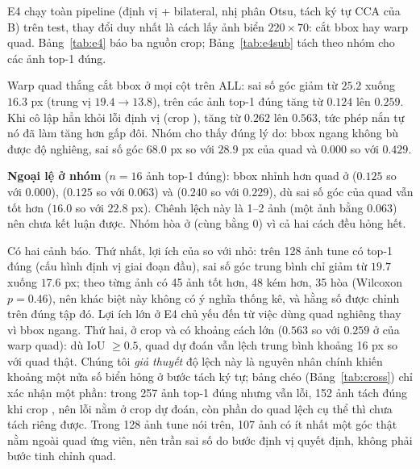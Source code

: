 E4 chạy toàn pipeline (định vị  + bilateral, nhị phân Otsu, tách ký tự CCA của B) trên test, thay đổi duy nhất là cách lấy ảnh biển $220\times 70$: cắt bbox hay warp quad. Bảng~\ref{tab:e4} báo ba nguồn crop; Bảng~\ref{tab:e4sub} tách theo nhóm cho các ảnh top-1 đúng.





Warp quad thắng cắt bbox ở mọi cột trên ALL: sai số góc giảm từ $25.2$ xuống $16.3$ px (trung vị $19.4\to 13.8$),  trên các ảnh top-1 đúng tăng từ $0.124$ lên $0.259$. Khi cô lập hẳn khỏi lỗi định vị (crop ),  tăng từ $0.262$ lên $0.563$, tức phép nắn tự nó đã làm  tăng hơn gấp đôi. Nhóm  cho thấy đúng lý do: bbox ngang không bù được độ nghiêng, sai số góc $68.0$ px so với $28.9$ px của quad và  $0.000$ so với $0.429$.

\textbf{Ngoại lệ ở nhóm } ($n=16$ ảnh top-1 đúng): bbox nhỉnh hơn quad ở  ($0.125$ so với $0.000$),  ($0.125$ so với $0.063$) và  ($0.240$ so với $0.229$), dù sai số góc của quad vẫn tốt hơn ($16.0$ so với $22.8$ px). Chênh lệch này là 1--2 ảnh (một ảnh bằng $0.063$) nên chưa kết luận được. Nhóm  hòa ở  (cùng bằng 0) vì cả hai cách đều hỏng hết.

Có hai cảnh báo. Thứ nhất, lợi ích của  so với  nhỏ: trên 128 ảnh tune có top-1 đúng (cấu hình định vị giai đoạn đầu), sai số góc trung bình chỉ giảm từ $19.7$ xuống $17.6$ px; theo từng ảnh có 45 ảnh tốt hơn, 48 kém hơn, 35 hòa (Wilcoxon $p=0.46$), nên khác biệt này không có ý nghĩa thống kê, và hằng số được chỉnh trên đúng tập đó. Lợi ích lớn ở E4 chủ yếu đến từ việc dùng quad nghiêng thay vì bbox ngang. Thứ hai, ở crop  và  có khoảng cách lớn ($0.563$ so với $0.259$ ở  của warp quad): dù IoU $\ge 0.5$, quad dự đoán vẫn lệch trung bình khoảng 16 px so với quad thật. Chúng tôi \emph{giả thuyết} độ lệch này là nguyên nhân chính khiến khoảng một nửa số biển hỏng ở bước tách ký tự; bảng chéo (Bảng~\ref{tab:cross}) chỉ xác nhận một phần: trong 257 ảnh top-1 đúng nhưng vẫn lỗi, 152 ảnh tách đúng khi crop , nên lỗi nằm ở crop dự đoán, còn phần do quad lệch cụ thể thì chưa tách riêng được. Trong 128 ảnh tune nói trên, 107 ảnh có ít nhất một góc thật nằm ngoài quad ứng viên, nên trần sai số do bước định vị quyết định, không phải bước tinh chỉnh quad.

